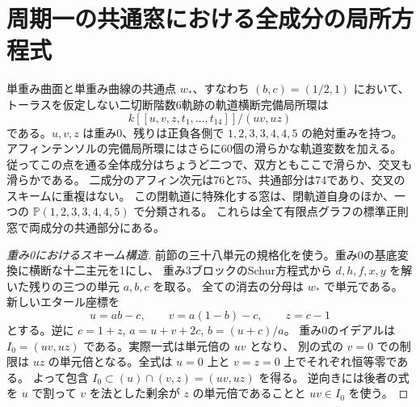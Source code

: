 \section{周期一の共通窓における全成分の局所方程式}
\label{sec:torus-component-crossing}
\begin{theorem}\label{thm:torus-component-crossing}
単重み曲面と単重み曲線の共通点 $w_*$、すなわち $(b,c)=(1/2,1)$ において、
トーラスを仮定しない二切断階数6軌跡の軌道横断完備局所環は
\[
 k[[u,v,z,t_1,\ldots,t_{14}]]/(uv,uz)
\]
である。$u,v,z$ は重み0、残りは正負各側で $1,2,3,3,4,4,5$ の絶対重みを持つ。
アフィンテンソルの完備局所環にはさらに60個の滑らかな軌道変数を加える。
従ってこの点を通る全体成分はちょうど二つで、双方ともここで滑らか、交叉も滑らかである。
二成分のアフィン次元は76と75、共通部分は74であり、交叉のスキームに重複はない。
この閉軌道に特殊化する窓は、閉軌道自身のほか、一つの $\mathbb P(1,2,3,3,4,4,5)$ で分類される。
これらは全て有限点グラフの標準正則窓で両成分の共通部分にある。
\end{theorem}
\begin{proof}[重み0におけるスキーム構造]
前節の三十八単元の規格化を使う。重み0の基底変換に横断な十二主元を1にし、
重み3ブロックのSchur方程式から $d,h,f,x,y$ を解いた残りの三つの単元 $a,b,c$ を取る。
全ての消去の分母は $w_*$ で単元である。新しいエタール座標を
\[
 u=ab-c,\qquad v=a(1-b)-c,\qquad z=c-1
\]
とする。逆に $c=1+z$, $a=u+v+2c$, $b=(u+c)/a$。
重み0のイデアルは $I_0=(uv,uz)$ である。実際一式は単元倍の $uv$ となり、
別の式の $v=0$ での制限は $uz$ の単元倍となる。全式は $u=0$ 上と $v=z=0$ 上でそれぞれ恒等零である。
よって包含 $I_0\subset (u)\cap(v,z)=(uv,uz)$ を得る。
逆向きには後者の式を $u$ で割って $v$ を法とした剰余が $z$ の単元倍であることと $uv\in I_0$ を使う。
\end{proof}

